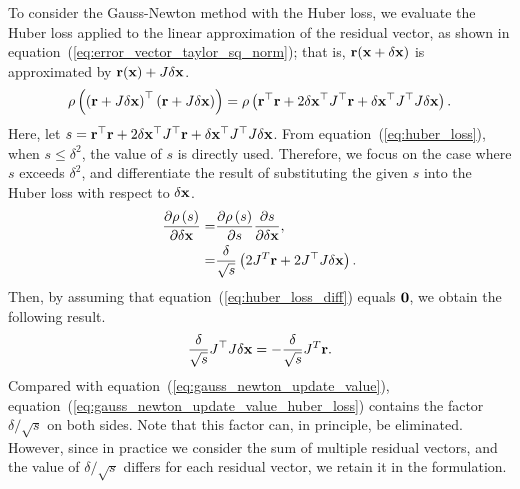 To consider the Gauss-Newton method with the Huber loss, we evaluate the Huber loss applied to the linear approximation of the residual vector, as shown in equation~(\ref{eq:error_vector_taylor_sq_norm}); that is, ${\bf r}({\bf x} + \delta {\bf x})$ is approximated by ${\bf r}({\bf x}) + J \delta {\bf x}$.
%
\begin{align}
  \rho \left( \left( {\bf r} + J \delta {\bf x} \right)^{\top} \left( {\bf r} + J \delta {\bf x} \right) \right)
  =
  \rho \left( {\bf r}^{\top} {\bf r} + 2 \delta {\bf x}^{\top} J^{\top} {\bf r} + \delta {\bf x}^{\top} J^{\top} J \delta {\bf x} \right).
\end{align}
%
Here, let $s = {\bf r}^{\top} {\bf r} + 2 \delta {\bf x}^{\top} J^{\top} {\bf r} + \delta {\bf x}^{\top} J^{\top} J \delta {\bf x}$.
From equation~(\ref{eq:huber_loss}), when $s \leq \delta^{2}$, the value of $s$ is directly used.
Therefore, we focus on the case where $s$ exceeds $\delta^{2}$, and differentiate the result of substituting the given $s$ into the Huber loss with respect to $\delta {\bf x}$.
%
\begin{align}
  \begin{split}
    \frac{ \partial \rho \left( s \right) }{ \partial \delta {\bf x} }
    = &
    \frac{ \partial \rho \left( s \right) }{ \partial s }
    \frac{ \partial s }{ \partial \delta {\bf x} }, \\
    = &
    \frac{ \delta }{ \sqrt{s} } \left( 2 J^{T} {\bf r} + 2 J^{\top} J \delta {\bf x} \right).
  \end{split}
  \label{eq:huber_loss_diff}
\end{align}
%
Then, by assuming that equation~(\ref{eq:huber_loss_diff}) equals ${\bf 0}$, we obtain the following result.
%
\begin{align}
  \frac{ \delta }{ \sqrt{s} } J^{\top} J \delta {\bf x} = -\frac{ \delta }{ \sqrt{s} } J^{T} {\bf r}.
  \label{eq:gauss_newton_update_value_huber_loss}
\end{align}
%
Compared with equation~(\ref{eq:gauss_newton_update_value}), equation~(\ref{eq:gauss_newton_update_value_huber_loss}) contains the factor $\delta / \sqrt{s}$ on both sides.
Note that this factor can, in principle, be eliminated.
However, since in practice we consider the sum of multiple residual vectors, and the value of $\delta / \sqrt{s}$ differs for each residual vector, we retain it in the formulation.

